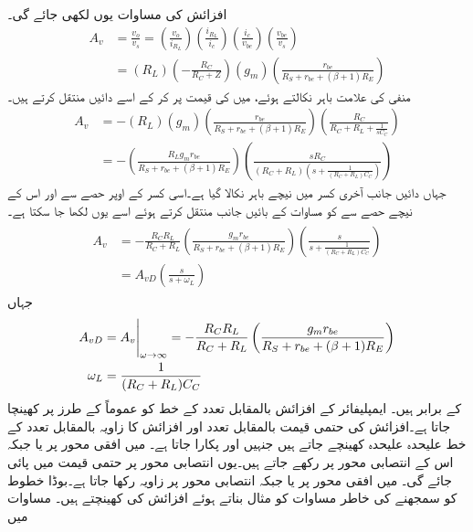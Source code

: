 افزائش کی مساوات یوں لکھی جائے گی۔ 
\begin{align*}
A_v&=\frac{v_o}{v_s}=\left(\frac{v_o}{i_{R_L}} \right ) \left(\frac{i_{R_L}}{i_c} \right ) \left (\frac{i_c}{v_{be}} \right ) \left (\frac{v_{be}}{v_s} \right )\\
&=\left(R_L \right ) \left(-\frac{R_C}{R_C+Z} \right ) \left(g_m \right ) \left (\frac{r_{be}}{R_S+r_{be}+(\beta+1)R_E} \right )
\end{align*}
منفی کی علامت باہر نکالتے ہوئے،  میں  کی قیمت پر کر کے اسے  دائیں منتقل کرتے ہیں۔
\begin{align*}
A_v&=-\left(R_L \right ) \left(g_m \right ) \left(\frac{r_{be}}{R_S+r_{be}+(\beta+1)R_E} \right ) \left (\frac{R_C}{R_C+R_L+\frac{1}{s C_C}} \right )\\
&=-\left(\frac{R_L g_m r_{be}}{R_S+r_{be}+(\beta+1)R_E} \right ) \left(\frac{s R_C}{\left(R_C+R_L \right ) \left(s+\frac{1}{(R_C+R_L)C_C} \right )} \right )
\end{align*}
جہاں دائیں جانب آخری کسر میں نیچے    باہر نکالا گیا ہے۔اسی کسر کے اوپر حصے سے  اور اس کے نیچے   حصے سے  کو مساوات کے بائیں جانب منتقل کرتے ہوئے اسے یوں لکھا جا سکتا ہے۔
\begin{gather}
\begin{aligned}
A_v&=-\frac{R_C R_L}{R_C + R_L}  \left(\frac{g_m r_{be}}{R_S+r_{be}+(\beta+1)R_E} \right ) \left(\frac{s}{s+\frac{1}{(R_C + R_L)C_C}} \right )\\
&=A_{vD} \left(\frac{s}{s+\omega_L} \right )
\end{aligned}
\end{gather}
جہاں
\begin{gather}
\begin{aligned}
A_{vD}&=\eval{A_v}_{\omega \to \infty}=-\frac{R_C R_L}{R_C + R_L}   \left(\frac{g_m r_{be}}{R_S+r_{be}+(\beta+1)R_E} \right ) \\
\omega_L&=\frac{1}{(R_C + R_L)C_C}
\end{aligned}
\end{gather}
کے برابر ہیں۔
ایمپلیفائر کے افزائش بالمقابل تعدد کے خط کو عموماً  کے طرز پر کھینچا جاتا ہے۔افزائش کی حتمی قیمت بالمقابل تعدد اور افزائش کا زاویہ بالمقابل تعدد کے خط علیحدہ علیحدہ کھینچے جاتے ہیں جنہیں  اور  پکارا جاتا ہے۔ میں افقی محور پر  یا  جبکہ اس کے انتصابی محور پر  رکھے جاتے ہیں۔یوں انتصابی محور پر حتمی قیمت  میں پائی جائے گی۔ میں افقی محور پر  یا  جبکہ انتصابی محور پر زاویہ  رکھا جاتا ہے۔بوڈا خطوط کو سمجھنے کی خاطر مساوات  کو مثال بناتے ہوئے افزائش کی  کھینچتے ہیں۔ مساوات میں
